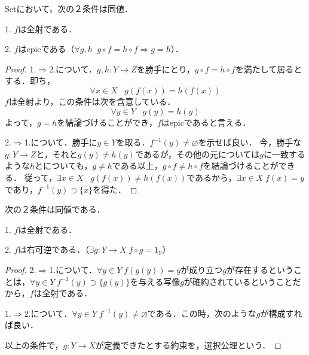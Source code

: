 \documentclass[uplatex, 12pt, dvipdfmx]{jsarticle}
\begin{document}
\begin{proposition*}
    Setにおいて，次の２条件は同値．
    \begin{center}
    \end{center}

    1. $f$は全射である．

    2. $f$はepicである（$\forall g,h\;\; g\circ f=h\circ f \Rightarrow g=h$）．
\end{proposition*}
\begin{proof}
    1.$\Rightarrow$2.について．$g,h:Y\to Z$を勝手にとり，$g\circ f=h\circ f$を満たして居るとする．即ち，
    \[ \forall x\in X\;\;\; g(f(x))=h(f(x)) \]
    $f$は全射より，この条件は次を含意している．
    \[ \forall y\in Y \;\;\; g(y)=h(y) \]
    よって，$g=h$を結論づけることができ，$f$はepicであると言える．

    2.$\Rightarrow$1.について．勝手に$y\in Y$を取る．$f^{-1}(y)\ne\varnothing$を示せば良い．
    今，勝手な$g:Y\to Z$と，それと$g(y)\ne h(y)$であるが，その他の元については$g$に一致するような$h$とについても，$g\ne h$である以上，$g\circ f\ne h\circ f$を結論づけることができる．
    従って，$\exists x\in X\;\;\;g(f(x))\ne h(f(x))$であるから，$\exists x\in X\; f(x)=y$であり，$f^{-1}(y)\supset \{x\}$を得た．
\end{proof}
\begin{proposition*}
    次の２条件は同値である．

    1. $f$は全射である．

    2. $f$は右可逆である．（$\exists g:Y\to X\; f\circ g=1_Y$）
\end{proposition*}
\begin{proof}
    2.$\Rightarrow$1.について．$\forall y\in Y\; f(g(y))=y$が成り立つ$g$が存在するということは，$\forall y\in Y\; f^{-1}(y)\supset \{g(y)\}$を与える写像$g$が確約されているということだから，$f$は全射である．

    1.$\Rightarrow$2.について．$\forall y\in Y\; f^{-1}(y)\ne\varnothing$である．この時，次のような$g$が構成すれば良い．
    \begin{center}
    \end{center}
    以上の条件で，$g:Y\to X$が定義できたとする約束を，選択公理という．
\end{proof}
\end{document}
